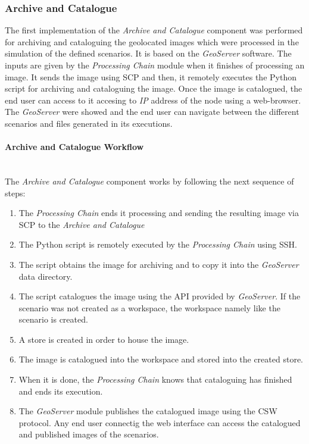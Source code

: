 \subsubsection{Archive and Catalogue}

The first implementation of the \emph{Archive and Catalogue} component was
performed for archiving and cataloguing the geolocated images which were
processed in the simulation of the defined scenarios. It is based on the
\emph{GeoServer} software. The inputs are given by the \emph {Processing Chain}
module when it finishes of processing an image. It sends the image using
\ac{SCP} and then, it remotely executes the Python script for archiving and
cataloguing the image. Once the image is catalogued, the end user can access to
it accesing to \emph{IP} address of the node using a web-browser. The
\emph{GeoServer} were showed and the end user can navigate between the different
scenarios and files generated in its executions.

\paragraph{Archive and Catalogue Workflow}~\\

The \emph{Archive and Catalogue} component works by following the next sequence
of steps:
\begin{enumerate}
\item The \emph{Processing Chain} ends it processing and sending the resulting
  image via \ac{SCP} to the \emph{Archive and Catalogue} 
\item The Python script is remotely executed by the \emph{Processing Chain}
  using \ac{SSH}.
\item The script obtains the image for archiving and to copy it into the
  \emph{GeoServer} data directory.
\item The script catalogues the image using the \ac{API} provided by
  \emph{GeoServer}. If the scenario was not created as a workspace, the
  workspace namely like the scenario is created.
  \item A store is created in order to house the image.
  \item The image is catalogued into the workspace and stored into the created store.
\item When it is done, the \emph{Processing Chain} knows that cataloguing has
  finished and ends its execution.
\item The \emph{GeoServer} module publishes the catalogued image using the
  \ac{CSW} protocol. Any end user connectig the web interface can access the
  catalogued and published images of the scenarios.
\end{enumerate}

